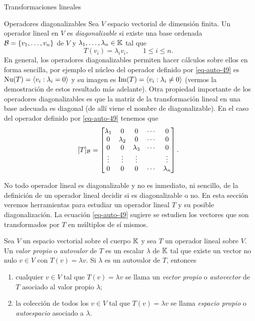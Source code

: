 \begin{chapter}{Transformaciones lineales}
\begin{section}{Operadores diagonalizables}
        Sea $V$ espacio vectorial de dimensión finita. Un operador lineal en $V$ es \textit{diagonalizable}  si existe una base ordenada $\mathcal{B}= \{v_1,\ldots,v_n\}$ de $V$ y $\lambda_1,\ldots,\lambda_n \in \mathbb K$ tal que 
        \begin{equation}\label{eq-auto-49}
            T(v_i) = \lambda_i v_i,\qquad 1\le i \le n. 
        \end{equation}
        En  general, los operadores diagonalizables permiten hacer cálculos sobre ellos en forma sencilla, por ejemplo el núcleo del  operador definido por \eqref{eq-auto-49} es $\operatorname{Nu}(T)=\langle v_i: \lambda_i =0 \rangle$ y  su imagen es $\operatorname{Im}(T)=\langle v_i: \lambda_i \not=0 \rangle$ (vermos la demostración de estos resultado más adelante). 
        Otra propiedad importante de los operadores diagonalizables es que la matriz de la transformación lineal en una base adecuada es diagonal (de allí viene el nombre de diagonalizable). En  el caso del  operador definido por \eqref{eq-auto-49} tenemos que
        $$
        [T]_{\mathcal{B}} = 
        \begin{bmatrix}
        \lambda_1&0&0&\cdots&0 \\
        0&\lambda_2&0&\cdots&0\\
        0&0&\lambda_3&\cdots&0\\
        \vdots&\vdots&\vdots&&\vdots\\
        0&0&0&\cdots&\lambda_n
        \end{bmatrix}.
        $$
        
        
        No todo operador lineal es diagonalizable y no es inmediato, ni sencillo, de la definición de un operador lineal decidir si es diagonalizable o no. En esta sección veremos herramientas para estudiar un operador lineal $T$ y su posible diagonalización. La ecuación \eqref{eq-auto-49} sugiere se estudien los vectores que son transformados por $T$ en múltiplos de sí mismos.
        
        \begin{definicion}
            Sea $V$ un espacio vectorial sobre el cuerpo $\mathbb K$ y sea $T$ un operador lineal sobre $V$. Un \textit{valor propio} o \textit{autovalor} de $T$ es un escalar $\lambda$ de $\mathbb K$ tal que existe un vector no nulo $v \in V$ con $T(v) = \lambda v$. Si $\lambda$ es un autovalor de $T$, entonces
            \begin{enumerate}
                \item  cualquier  $v \in V$ tal que $T(v) = \lambda v$  se llama un \textit{vector propio} o  \textit{autovector} de $T$ asociado al valor propio $\lambda$;
                \item la colección de todos los $v \in V$ tal que $T(v) = \lambda v$  se llama \textit{espacio propio} o \textit{autoespacio} 	asociado a $\lambda$. 
            \end{enumerate}
            

\end{definicion}
\end{section}
\end{chapter}
